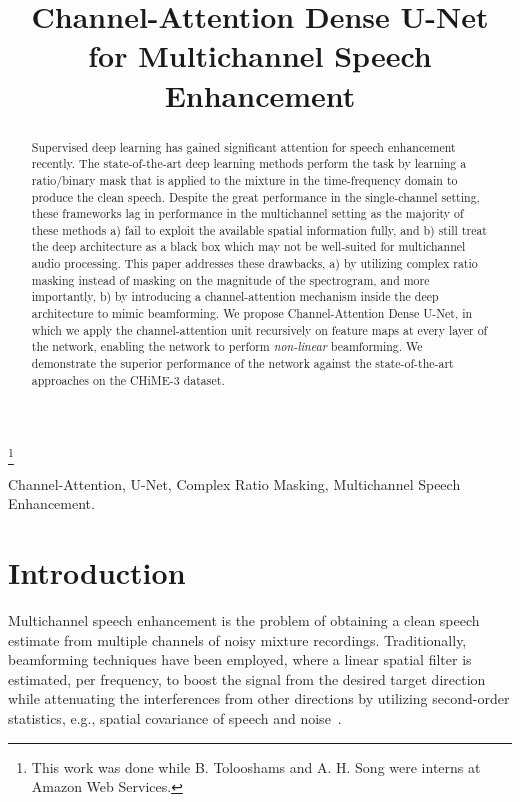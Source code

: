 \documentclass{article}
\title{Channel-Attention Dense U-Net for Multichannel Speech Enhancement}
\newcommand\blfootnote[1]{\begingroup
	\renewcommand\thefootnote{}\footnote{#1}\addtocounter{footnote}{-1}\endgroup
}
\begin{document}
\sloppy

\setlength{\abovedisplayskip}{1mm}
\setlength{\belowdisplayskip}{1mm}

\ninept
\maketitle
\begin{abstract}

Supervised deep learning has gained significant attention for speech enhancement recently. The state-of-the-art deep learning methods perform the task by learning a ratio/binary mask that is applied to the mixture in the time-frequency domain to produce the clean speech. Despite the great performance in the single-channel setting, these frameworks lag in performance in the multichannel setting as the majority of these methods a) fail to exploit the available spatial information fully, and b) still treat the deep architecture as a black box which may not be well-suited for multichannel audio processing. This paper addresses these drawbacks, a) by utilizing complex ratio masking instead of masking on the magnitude of the spectrogram, and more importantly, b) by introducing a channel-attention mechanism inside the deep architecture to mimic beamforming. We propose Channel-Attention Dense U-Net, in which we apply the channel-attention unit recursively on feature maps at every layer of the network, enabling the network to perform \emph{non-linear} beamforming. We demonstrate the superior performance of the network against the state-of-the-art approaches on the CHiME-3 dataset.

\end{abstract}

\blfootnote{This work was done while B. Tolooshams and A. H. Song were interns at Amazon Web Services.}



\begin{keywords}
Channel-Attention, U-Net, Complex Ratio Masking, Multichannel Speech Enhancement.
\end{keywords}
\section{Introduction}
\label{sec:intro}



Multichannel speech enhancement is the problem of obtaining a clean speech estimate from  multiple channels of noisy mixture recordings. Traditionally, beamforming techniques have been employed, where a linear spatial filter is estimated, per frequency, to boost the signal from the desired target direction while attenuating the interferences from other directions by utilizing second-order statistics, e.g., spatial covariance of speech and noise~\cite{benesty2008microphone}.
\end{document}
